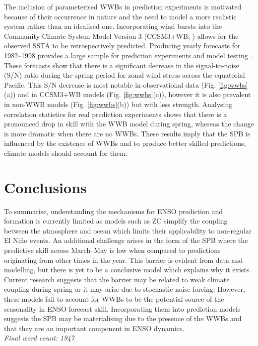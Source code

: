 \documentclass[12pt, onecolumn]{revtex4}    %
\begin{document}
The inclusion of parameterised WWBs in prediction experiments is motivated because of their occurrence in nature and the need to model a more realistic system rather than an idealised one. Incorporating wind bursts into the Community Climate System Model Version 3 (CCSM3+WB; \citealt{collins2006community}) allows for the observed SSTA to be retrospectively predicted. Producing yearly forecasts for 1982--1998 provides a large sample for prediction experiments and model testing \citep{lopez2014wwbs}. These forecasts show that there is a significant decrease in the signal-to-noise (S/N) ratio during the spring period for zonal wind stress across the equatorial Pacific. This S/N decrease is most notable in observational data (Fig. \ref{fig:wwbs}(a)) and in CCSM3+WB models (Fig. \ref{fig:wwbs}(c)), however it is also prevalent in non-WWB models (Fig. \ref{fig:wwbs}(b)) but with less strength. Analysing correlation statistics for real prediction experiments shows that there is a pronounced drop in skill with the WWB model during spring, whereas the change is more dramatic when there are no WWBs. These results imply that the SPB is influenced by the existence of WWBs and to produce better skilled predictions, climate models should account for them.

\section{Conclusions}
\noindent
To summarise, understanding the mechanisms for ENSO prediction and formation is currently limited as models such as ZC simplify the coupling between the atmosphere and ocean which limits their applicability to non-regular El Ni\~{n}o events. An additional challenge arises in the form of the SPB where the predictive skill across March--May is low when compared to predictions originating from other times in the year. This barrier is evident from data and modelling, but there is yet to be a conclusive model which explains why it exists. Current research suggests that the barrier may be related to weak climate coupling during spring or it may arise due to stochastic noise forcing. However, these models fail to account for WWBs to be the potential source of the seasonality in ENSO forecast skill. Incorporating them into prediction models suggests the SPB may be materialising due to the presence of the WWBs and that they are an important component in ENSO dynamics. \\

\textit{Final word count: 1947}


\clearpage



\end{document}
